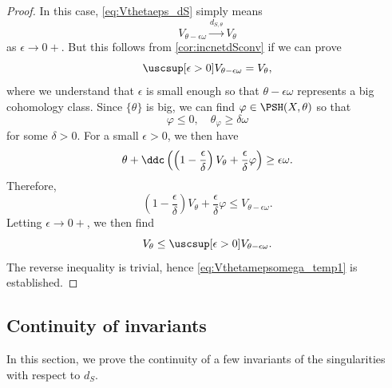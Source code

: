\begin{proof}
In this case, \eqref{eq:Vthetaeps_dS} simply means
\[
V_{\theta-\epsilon\omega}\xrightarrow{d_{S,\theta}}V_{\theta}
\]
as $\epsilon\to 0+$.
But this follows from \cref{cor:incnetdSconv} if we can prove
\begin{equation}\label{eq:Vthetamepsomega_temp1}
\uscsup[\epsilon>0] V_{\theta-\epsilon\omega}=V_{\theta},
\end{equation}
where we understand that $\epsilon$ is small enough so that $\theta-\epsilon\omega$ represents a big cohomology class. Since $\{\theta\}$ is big, we can find $\varphi\in \PSH(X,\theta)$ so that
\[
\varphi\leq 0,\quad \theta_{\varphi}\geq \delta\omega
\]
for some $\delta>0$. For a small $\epsilon>0$, we then have
\[
\theta+\ddc \left( \left(1-\frac{\epsilon}{\delta}\right)V_{\theta}+ \frac{\epsilon}{\delta}\varphi\right)\geq \epsilon\omega.
\]
Therefore,
\[
\left(1-\frac{\epsilon}{\delta}\right)V_{\theta}+ \frac{\epsilon}{\delta}\varphi\leq V_{\theta-\epsilon\omega}.
\]
Letting $\epsilon\to 0+$, we then find
\[
V_{\theta}\leq \uscsup[\epsilon>0] V_{\theta-\epsilon\omega}.
\]
The reverse inequality is trivial, hence \eqref{eq:Vthetamepsomega_temp1} is established.
\end{proof}

\subsection{Continuity of invariants}\label{subsec:continv}
In this section, we prove the continuity of a few invariants of the singularities with respect to $d_S$.



